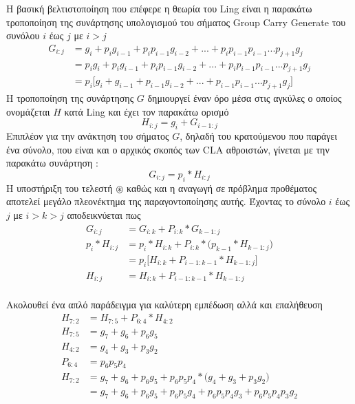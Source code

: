 Η βασική βελτιστοποίηση που επέφερε η θεωρία του Ling είναι η παρακάτω τροποποίηση 
της συνάρτησης υπολογισμού του σήματος Group Carry Generate του συνόλου $i$ έως $j$ με $i > j$
\begin{equation}
\begin{split}
    G_{i:j} &= g_i + p_ig_{i-1} + p_ip_{i-1}g_{i-2} + ... + p_ip_{i-1}p_{i-1}...p_{j+1}g_j\\
            &= p_ig_i + p_ig_{i-1} + p_ip_{i-1}g_{i-2} + ... + p_ip_{i-1}p_{i-1}...p_{j+1}g_j\\
            &= p_i \bigg[ g_i + g_{i-1} + p_{i-1}g_{i-2} + ... + p_{i-1}p_{i-1}...p_{j+1}g_j \bigg]
\end{split}
\end{equation}
Η τροποποίηση της συνάρτησης $G$ δημιουργεί έναν όρο μέσα στις αγκύλες ο οποίος
ονομάζεται $H$ κατά Ling και έχει τον παρακάτω ορισμό 
\begin{equation}
    H_{i:j} = g_i + G_{i-1:j}
\end{equation}
Επιπλέον για την ανάκτηση του σήματος $G$, δηλαδή του κρατούμενου που παράγει ένα σύνολο, 
που είναι και ο αρχικός σκοπός των CLA αθροιστών, γίνεται με την παρακάτω συνάρτηση :
\begin{equation}
    G_{i:j} = p_i * H_{i:j}
\end{equation}
Η υποστήριξη του τελεστή $\circledast$ καθώς και η αναγωγή σε πρόβλημα προθέματος αποτελεί μεγάλο πλεονέκτημα της παραγοντοποίησης αυτής. Έχοντας το σύνολο $i$ έως $j$ με $i>k>j$ αποδεικνύεται πως
\begin{equation}
\begin{split}
    G_{i:j} &= G_{i:k} + P_{i:k}*G_{k-1:j}\\
    p_i * H_{i:j}  &= p_i * H_{i:k} + P_{i:k}*\big( p_{k-1}*H_{k-1:j}\big)\\
            &= p_i \big[  H_{i:k} + P_{i-1:k-1}*H_{k-1:j}    \big] \\
    H_{i:j}  &= H_{i:k} + P_{i-1:k-1}*H_{k-1:j}
\end{split}
\end{equation}
\\
Ακολουθεί ένα απλό παράδειγμα για καλύτερη εμπέδωση αλλά και επαλήθευση 
\begin{equation*}
\begin{split}
    H_{7:2} &= H_{7:5} + P_{6:4}*H_{4:2} \\
    H_{7:5} &= g_7 + g_6 + p_6g_5 \\
    H_{4:2} &= g_4 + g_3 + p_3g_2 \\
    P_{6:4} &= p_6p_5p_4\\
    H_{7:2} &= g_7 + g_6 + p_6g_5 + p_6p_5p_4*\big(g_4 + g_3 + p_3g_2 \big)\\
            &= g_7 + g_6 + p_6g_5 + p_6p_5g_4 + p_6p_5p_4g_3 + p_6p_5p_4p_3g_2
\end{split}
\end{equation*}
